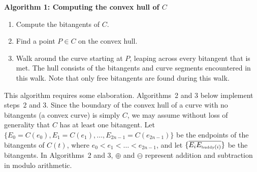 \documentclass{sig-alternate}
\newcommand{\seg}[1]{\mbox{$\overline{#1}$}}
\begin{document}
\vspace{.2in}

\centerline{{\bf Algorithm 1: Computing the convex hull of $C$}}

\begin{enumerate}
\item Compute the bitangents of $C$.
\item Find a point $P \in C$ on the convex hull.
\item Walk around the curve starting at $P$, leaping across every bitangent that is met.
  The hull consists of the bitangents and curve segments encountered in this walk.
  Note that only free bitangents are found during this walk.
\end{enumerate}

This algorithm requires some elaboration.
Algorithms~2 and 3 below implement steps~2 and 3.
Since the boundary of the convex hull of a curve with no bitangents (a convex curve)
is simply $C$, we may assume without loss of generality that $C$ has at least one bitangent.
Let $\{E_0 = C(e_0), E_1 = C(e_1), \ldots, E_{2n-1} = C(e_{2n-1})\}$
be the endpoints of the bitangents of $C(t)$, where $e_0 < e_1 < \ldots < e_{2n-1}$, and
let $\{\seg{E_i E_{\mbox{\tiny{buddy}}(i)}}\}$ be the bitangents.
In Algorithms~2 and 3, $\oplus$ and $\ominus$ represent addition and subtraction in modulo arithmetic.
\end{document}
